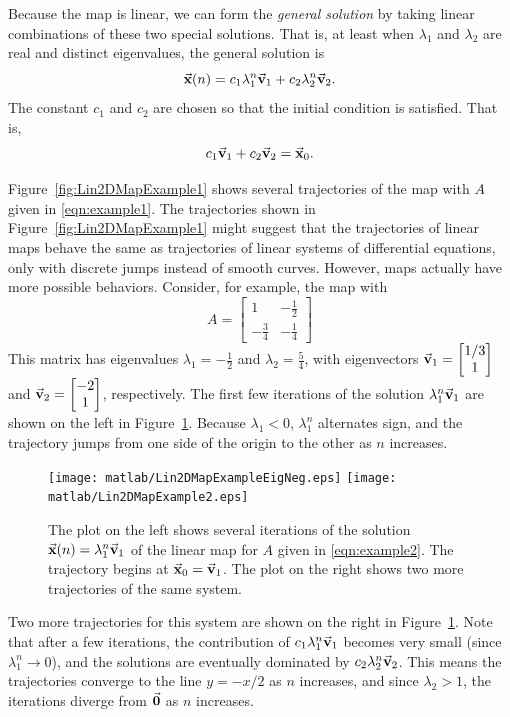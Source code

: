 Because the map is linear, we can form the \emph{general solution}
by taking linear combinations of these two special solutions.
That is, at least when $\lambda_1$ and $\lambda_2$ are real and
distinct eigenvalues, the general solution is
\begin{equation}
   \vec{\textbf{x}}(n) = c_1 \lambda_1^n \vec{\textbf{v}}_1 + c_2 \lambda_2^n \vec{\textbf{v}}_2.
\end{equation}
The constant $c_1$ and $c_2$ are chosen so that
the initial condition is satisfied. That is, 
\begin{equation}
   c_1 \vec{\textbf{v}}_1 + c_2 \vec{\textbf{v}}_2 = \vec{\textbf{x}}_0.
\end{equation}


Figure~\ref{fig:Lin2DMapExample1} shows several trajectories
of the map with $A$ given in \eqref{eqn:example1}.
The trajectories shown in Figure~\ref{fig:Lin2DMapExample1}
might suggest that the trajectories of linear maps
behave the same as trajectories of
linear systems of  differential equations,
only with discrete jumps instead of smooth curves.
However, maps actually have more possible behaviors.
Consider, for example, the map with
\begin{equation}
  A = \begin{bmatrix} 1 & -\frac{1}{2} \\
                  -\frac{3}{4} & -\frac{1}{4}
      \end{bmatrix}
\label{eqn:example2}
\end{equation}
This matrix has eigenvalues $\lambda_1 = -\frac{1}{2}$ and
$\lambda_2 = \frac{5}{4}$, with eigenvectors
$\vec{\textbf{v}}_1 = \begin{bmatrix} 1/3 \\ 1\end{bmatrix}$
and $\vec{\textbf{v}}_2 = \begin{bmatrix} -2 \\ 1 \end{bmatrix}$, 
respectively.
The first few iterations of the solution $\lambda_1^n \vec{\textbf{v}}_1$
are shown on the left in Figure~\ref{fig:Lin2DMapExample2}.
Because $\lambda_1 < 0$, $\lambda_1^n$ alternates sign, and the
trajectory jumps from one side of the origin to the other
as $n$ increases.
\begin{figure}
\centerline{%
\texttt{[image: matlab/Lin2DMapExampleEigNeg.eps]}
\texttt{[image: matlab/Lin2DMapExample2.eps]}
}
\caption{%
The plot on the left shows several iterations of the
solution $\vec{\textbf{x}}(n) = \lambda_1^n\vec{\textbf{v}}_1$ of the linear map
for $A$ given in \eqref{eqn:example2}.
The trajectory begins at
$\vec{\textbf{x}}_0 = \vec{\textbf{v}}_1$.
The plot on the right shows two more trajectories
of the same system.
}
\label{fig:Lin2DMapExample2}
\end{figure}
Two more trajectories for this system are shown on the right
in Figure~\ref{fig:Lin2DMapExample2}.
Note that after a few iterations,
the contribution of $c_1\lambda_1^n\vec{\textbf{v}}_1$
becomes very small (since $\lambda_1^n\rightarrow 0$),
and the solutions are eventually dominated by 
$c_2\lambda_2^n\vec{\textbf{v}}_2$.  This means the trajectories
converge to the line $y=-x/2$ as $n$ increases,
and since $\lambda_2 > 1$, the iterations diverge
from $\vec{\textbf{0}}$ as $n$ increases.

